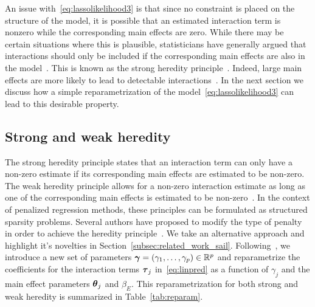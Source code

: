 An issue with~\eqref{eq:lassolikelihood3} is that since no constraint is placed on the structure of the model, it is possible that an estimated interaction term is nonzero while the corresponding main effects are zero. While there may be certain situations where this is plausible, statisticians have generally argued that interactions should only be included if the corresponding main effects are also in the model~\citep{mccullagh1989generalized}. This is known as the strong heredity principle~\citep{chipman1996bayesian}. Indeed, large main effects are more likely to lead to detectable interactions~\citep{cox1984interaction}. In the next section we discuss how a simple reparametrization of the model~\eqref{eq:lassolikelihood3} can lead to this desirable property. 

\subsection{Strong and weak heredity}

The strong heredity principle states that an interaction term can only have a non-zero estimate if its corresponding main effects are estimated to be non-zero. The weak heredity principle allows for a non-zero interaction estimate as long as one of the corresponding main effects is estimated to be non-zero~\citep{chipman1996bayesian}. In the context of penalized regression methods, these principles can be formulated as structured sparsity \citep{bach2012structured} problems. Several authors have proposed to modify the type of penalty in order to achieve the heredity principle~\citep{radchenko2010variable,bien2013lasso,haris2014convex,lim2014learning}. We take an alternative approach and highlight it's novelties in Section~\ref{subsec:related_work_sail}. Following~\cite{choi2010variable}, we introduce a new set of parameters $\boldsymbol{\gamma} = (\gamma_1, \ldots, \gamma_p)\in \mathbb{R}^p$ and reparametrize the coefficients for the interaction terms $\boldsymbol{\tau}_j$ in~\eqref{eq:linpred} as a function of $\gamma_j$ and the main effect parameters $\boldsymbol{\theta}_j$ and $\beta_E$. This reparametrization for both strong and weak heredity is summarized in Table~\ref{tab:reparam}.

